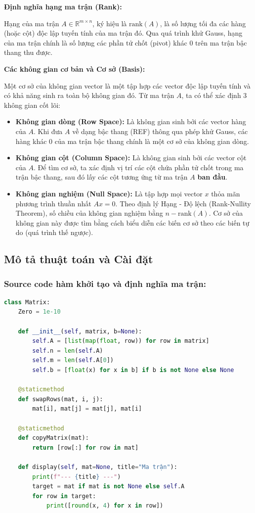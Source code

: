 \documentclass[a4paper]{article}
\begin{document}
\textbf{Định nghĩa hạng ma trận (Rank):}

Hạng của ma trận $A \in \mathbb{R}^{m \times n}$, ký hiệu là $\text{rank}(A)$, là số lượng tối đa các hàng (hoặc cột) độc lập tuyến tính của ma trận đó. Qua quá trình khử Gauss, hạng của ma trận chính là số lượng các phần tử chốt (pivot) khác $0$ trên ma trận bậc thang thu được.

\textbf{Các không gian cơ bản và Cơ sở (Basis):}

Một cơ sở của không gian vector là một tập hợp các vector độc lập tuyến tính và có khả năng sinh ra toàn bộ không gian đó. Từ ma trận $A$, ta có thể xác định 3 không gian cốt lõi:

\begin{itemize}
    \item \textbf{Không gian dòng (Row Space):} Là không gian sinh bởi các vector hàng của $A$. Khi đưa $A$ về dạng bậc thang (REF) thông qua phép khử Gauss, các hàng khác $0$ của ma trận bậc thang chính là một cơ sở của không gian dòng.
    \item \textbf{Không gian cột (Column Space):} Là không gian sinh bởi các vector cột của $A$. Để tìm cơ sở, ta xác định vị trí các cột chứa phần tử chốt trong ma trận bậc thang, sau đó lấy các cột tương ứng từ ma trận $A$ \textbf{ban đầu}.
    \item \textbf{Không gian nghiệm (Null Space):} Là tập hợp mọi vector $x$ thỏa mãn phương trình thuần nhất $Ax = 0$. Theo định lý Hạng - Độ lệch (Rank-Nullity Theorem), số chiều của không gian nghiệm bằng $n - \text{rank}(A)$. Cơ sở của không gian này được tìm bằng cách biểu diễn các biến cơ sở theo các biến tự do (quá trình thế ngược).
\end{itemize}

\subsection{Mô tả thuật toán và Cài đặt}
\subsubsection{Source code hàm khởi tạo và định nghĩa ma trận: }

\begin{lstlisting}[language=Python, caption={Hàm khởi tạo và định nghĩa ma trận - matrix.py}]
class Matrix:
    Zero = 1e-10
    
    def __init__(self, matrix, b=None):
        self.A = [list(map(float, row)) for row in matrix]
        self.n = len(self.A)
        self.m = len(self.A[0])
        self.b = [float(x) for x in b] if b is not None else None

    @staticmethod
    def swapRows(mat, i, j):
        mat[i], mat[j] = mat[j], mat[i]

    @staticmethod
    def copyMatrix(mat):
        return [row[:] for row in mat]
        
    def display(self, mat=None, title="Ma trận"):
        print(f"--- {title} ---")
        target = mat if mat is not None else self.A
        for row in target:
            print([round(x, 4) for x in row])
\end{lstlisting}
\end{document}

